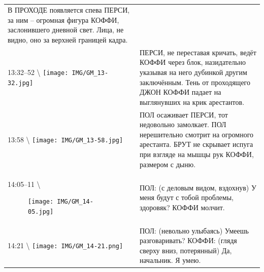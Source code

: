 \begin{longtable}[]{@{}ll@{}}
\begin{minipage}[t]{0.68\columnwidth}
В ПРОХОДЕ появляется спева ПЕРСИ, за ним -- огромная фигура
КОФФИ, заслонившего дневной свет. Лица, не видно, оно
за верхней границей кадра.\strut
\end{minipage}\tabularnewline
\begin{minipage}[t]{0.27\columnwidth}\raggedright\strut
13:32--52 \textbackslash{}
\texttt{[image: IMG/GM\_13-32.jpg]}\strut
\end{minipage} & \begin{minipage}[t]{0.68\columnwidth}\raggedright\strut
ПЕРСИ, не переставая кричать, ведёт КОФФИ через блок,
назидательно указывая на него дубинкой другим заключённым.
Тень от проходящего ДЖОН КОФФИ падает на выглянувших на
крик арестантов.\strut
\end{minipage}\tabularnewline
\begin{minipage}[t]{0.27\columnwidth}\raggedright\strut
13:58 \textbackslash{}
\texttt{[image: IMG/GM\_13-58.jpg]}\strut
\end{minipage} & \begin{minipage}[t]{0.68\columnwidth}\raggedright\strut
ПОЛ осаживает ПЕРСИ, тот недовольно замолкает.
ПОЛ нерешительно смотрит на огромного арестанта.
БРУТ не скрывает испуга при взгляде на мышцы рук КОФФИ,
размером с дыню.\strut
\end{minipage}\tabularnewline
\begin{minipage}[t]{0.48\columnwidth}\raggedright\strut
14:05--11 \textbackslash{}

\begin{figure}
\centering
\texttt{[image: IMG/GM\_14-05.jpg]}
\caption{}
\end{figure}
\strut
\end{minipage} & \begin{minipage}[t]{0.48\columnwidth}\raggedright\strut
ПОЛ: (с деловым видом, вздохнув) У меня будут с тобой
проблемы, здоровяк?
КОФФИ молчит.\strut
\end{minipage}\tabularnewline
\begin{minipage}[t]{0.27\columnwidth}\raggedright\strut
14:21 \textbackslash{}
\texttt{[image: IMG/GM\_14-21.png]}\strut
\end{minipage} & \begin{minipage}[t]{0.68\columnwidth}\raggedright\strut
ПОЛ: (невольно улыбаясь) Умеешь разговаривать?
КОФФИ: (глядя сверху вниз, потерянный) Да, начальник.
Я умею.\strut
\end{minipage}\tabularnewline
\bottomrule
\end{longtable}

